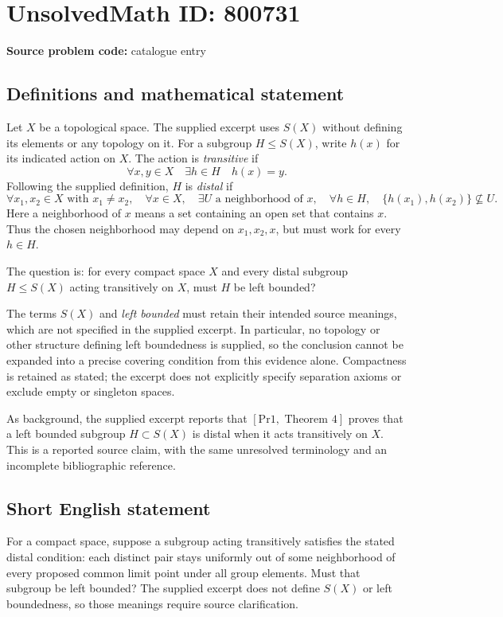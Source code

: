 \documentclass[11pt]{article}
\begin{document}
\section*{UnsolvedMath ID: 800731}
\textbf{Source problem code:} catalogue entry
\subsection{Definitions and mathematical statement}
Let \(X\) be a topological space. The supplied excerpt uses \(S(X)\) without defining its elements or any topology on it. For a subgroup \(H\leq S(X)\), write \(h(x)\) for its indicated action on \(X\). The action is \emph{transitive} if
\[
\forall x,y\in X\quad \exists h\in H\quad h(x)=y.
\]
Following the supplied definition, \(H\) is \emph{distal} if
\[
\forall x_1,x_2\in X\text{ with }x_1\ne x_2,\quad
\forall x\in X,\quad
\exists U\text{ a neighborhood of }x,\quad
\forall h\in H,\quad
\{h(x_1),h(x_2)\}\not\subseteq U.
\]
Here a neighborhood of \(x\) means a set containing an open set that contains \(x\). Thus the chosen neighborhood may depend on \(x_1,x_2,x\), but must work for every \(h\in H\).

The question is: for every compact space \(X\) and every distal subgroup \(H\leq S(X)\) acting transitively on \(X\), must \(H\) be left bounded?

The terms \(S(X)\) and \emph{left bounded} must retain their intended source meanings, which are not specified in the supplied excerpt. In particular, no topology or other structure defining left boundedness is supplied, so the conclusion cannot be expanded into a precise covering condition from this evidence alone. Compactness is retained as stated; the excerpt does not explicitly specify separation axioms or exclude empty or singleton spaces.

As background, the supplied excerpt reports that \([\mathrm{Pr1},\text{ Theorem }4]\) proves that a left bounded subgroup \(H\subset S(X)\) is distal when it acts transitively on \(X\). This is a reported source claim, with the same unresolved terminology and an incomplete bibliographic reference.
\subsection{Short English statement}
For a compact space, suppose a subgroup acting transitively satisfies the stated distal condition: each distinct pair stays uniformly out of some neighborhood of every proposed common limit point under all group elements. Must that subgroup be left bounded? The supplied excerpt does not define \(S(X)\) or left boundedness, so those meanings require source clarification.
\end{document}
